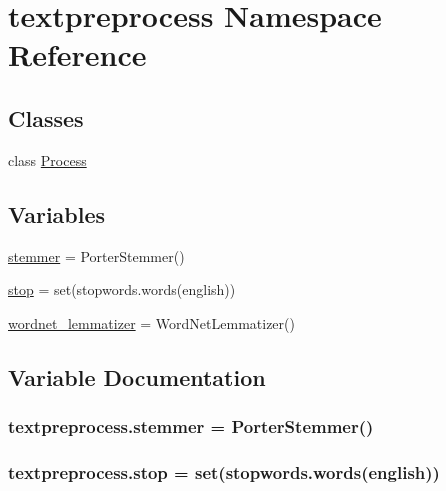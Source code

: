 \hypertarget{namespacetextpreprocess}{}\section{textpreprocess Namespace Reference}
\label{namespacetextpreprocess}
\subsection*{Classes}
\begin{DoxyCompactItemize}
\item 
class \hyperlink{classtextpreprocess_1_1_process}{Process}
\end{DoxyCompactItemize}
\subsection*{Variables}
\begin{DoxyCompactItemize}
\item 
\hyperlink{namespacetextpreprocess_a2f906bcff97edf572342b3c30e5f0293}{stemmer} = Porter\+Stemmer()
\item 
\hyperlink{namespacetextpreprocess_ab5ed74deb9e3859d67a108be0ea166d9}{stop} = set(stopwords.\+words(\textquotesingle{}english\textquotesingle{}))
\item 
\hyperlink{namespacetextpreprocess_a24616b4e8776baa0d1acc010b36fd23e}{wordnet\+\_\+lemmatizer} = Word\+Net\+Lemmatizer()
\end{DoxyCompactItemize}


\subsection{Variable Documentation}
\subsubsection[{\texorpdfstring{stemmer}{stemmer}}]{\setlength{\rightskip}{0pt plus 5cm}textpreprocess.\+stemmer = Porter\+Stemmer()}\hypertarget{namespacetextpreprocess_a2f906bcff97edf572342b3c30e5f0293}{}\label{namespacetextpreprocess_a2f906bcff97edf572342b3c30e5f0293}
\subsubsection[{\texorpdfstring{stop}{stop}}]{\setlength{\rightskip}{0pt plus 5cm}textpreprocess.\+stop = set(stopwords.\+words(\textquotesingle{}english\textquotesingle{}))}\hypertarget{namespacetextpreprocess_ab5ed74deb9e3859d67a108be0ea166d9}{}\label{namespacetextpreprocess_ab5ed74deb9e3859d67a108be0ea166d9}
